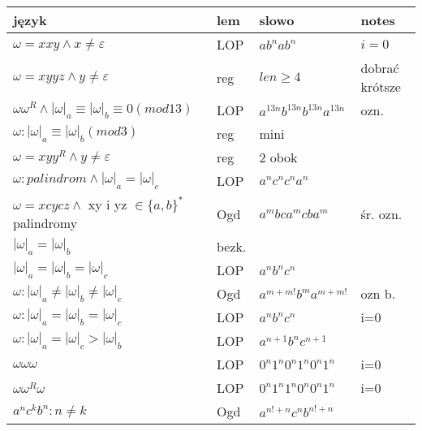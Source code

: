 
\begin{tabular}{l|l|l|l}
  język & lem & slowo & notes\\
  \hline
    $\omega = xxy \wedge x \neq \varepsilon $ & LOP & 
    $ab^{n}ab^{n}$ & $i=0$ \\
  \hline 
    $\omega = xyyz \wedge y \neq \varepsilon $ & reg & 
    $len \geqslant 4$ & dobrać krótsze \\
  \hline
    $\omega \omega ^{R} \wedge |\omega|_{a}\equiv |\omega|_{b} \equiv 0 (mod 13) $ & LOP & 
    $a^{13n}b^{13n}b^{13n}a^{13n}$ & ozn. \\
  \hline
  $\omega : |\omega|_{a}\equiv |\omega|_{b}(mod 3) $ & reg & 
  mini & \\
  \hline
    $\omega = xyy^{R} \wedge y \neq \varepsilon$ & reg & 
    2 obok & \\
  \hline
    $\omega:palindrom \wedge |\omega|_{a} = |\omega|_{c} $ & LOP & 
    $a^{n}c^{n}c^{n}a^{n}$ \\
  \hline
    $\omega = xcycz \wedge$ xy i yz $\in \lbrace a,b \rbrace ^{*}$palindromy & Ogd & $a^{m}bca^{m}cba^{m}$ & śr. ozn. \\
  \hline
    $|\omega|_{a} = |\omega|_{b}$ & bezk. & \\
  \hline
    $|\omega|_{a} = |\omega|_{b}= |\omega|_{c}$ & LOP & $a^{n}b^{n}c^{n}$ & \\
  \hline
    $\omega : |\omega|_{a} \neq |\omega|_{b} \neq |\omega|_{c}$ & Ogd & $a^{m+m!}b^{m}a^{m+m!}$ & ozn b.\\
  \hline 
    $\omega : |\omega|_{a} = |\omega|_{b} = |\omega|_{c}$ & LOP & $a^{n}b^{n}c^{n}$ & i=0\\
  \hline
    $\omega : |\omega|_{a} = |\omega|_{c} > |\omega|_{b}$ & LOP & $a^{n+1}b^{n}c^{n+1}$ &\\
  \hline
    $\omega\omega\omega$ & LOP & $0^{n}1^{n}0^{n}1^{n}0^{n}1^{n}$ & i=0\\
  \hline
    $\omega\omega^{R}\omega$ & LOP & $0^{n}1^{n}1^{n}0^{n}0^{n}1^{n}$ & i=0\\
  \hline
    $a^{n}c^{k}b^{n} : n \neq k$ & Ogd & $a^{n!+n}c^{n}b^{n!+n}$& \\
\end{tabular}
